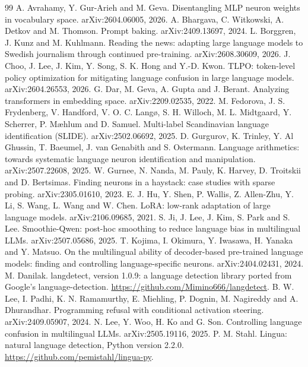 \documentclass[10pt,a4paper]{article}
\begin{document}
\begin{thebibliography}{99}\small\setlength{\itemsep}{1pt}
 A. Avrahamy, Y. Gur-Arieh and M. Geva. Disentangling MLP neuron weights in vocabulary space. arXiv:2604.06005, 2026.
 A. Bhargava, C. Witkowski, A. Detkov and M. Thomson. Prompt baking. arXiv:2409.13697, 2024.
 L. Borggren, J. Kunz and M. Kuhlmann. Reading the news: adapting large language models to Swedish journalism through continued pre-training. arXiv:2608.30609, 2026.
 J. Choo, J. Lee, J. Kim, Y. Song, S. K. Hong and Y.-D. Kwon. TLPO: token-level policy optimization for mitigating language confusion in large language models. arXiv:2604.26553, 2026.
 G. Dar, M. Geva, A. Gupta and J. Berant. Analyzing transformers in embedding space. arXiv:2209.02535, 2022.
 M. Fedorova, J. S. Frydenberg, V. Handford, V. O. C. Langø, S. H. Willoch, M. L. Midtgaard, Y. Scherrer, P. Mæhlum and D. Samuel. Multi-label Scandinavian language identification (SLIDE). arXiv:2502.06692, 2025.
 D. Gurgurov, K. Trinley, Y. Al Ghussin, T. Baeumel, J. van Genabith and S. Ostermann. Language arithmetics: towards systematic language neuron identification and manipulation. arXiv:2507.22608, 2025.
 W. Gurnee, N. Nanda, M. Pauly, K. Harvey, D. Troitskii and D. Bertsimas. Finding neurons in a haystack: case studies with sparse probing. arXiv:2305.01610, 2023.
 E. J. Hu, Y. Shen, P. Wallis, Z. Allen-Zhu, Y. Li, S. Wang, L. Wang and W. Chen. LoRA: low-rank adaptation of large language models. arXiv:2106.09685, 2021.
 S. Ji, J. Lee, J. Kim, S. Park and S. Lee. Smoothie-Qwen: post-hoc smoothing to reduce language bias in multilingual LLMs. arXiv:2507.05686, 2025.
 T. Kojima, I. Okimura, Y. Iwasawa, H. Yanaka and Y. Matsuo. On the multilingual ability of decoder-based pre-trained language models: finding and controlling language-specific neurons. arXiv:2404.02431, 2024.
 M. Danilak. langdetect, version 1.0.9: a language detection library ported from Google's language-detection. \url{https://github.com/Mimino666/langdetect}.
 B. W. Lee, I. Padhi, K. N. Ramamurthy, E. Miehling, P. Dognin, M. Nagireddy and A. Dhurandhar. Programming refusal with conditional activation steering. arXiv:2409.05907, 2024.
 N. Lee, Y. Woo, H. Ko and G. Son. Controlling language confusion in multilingual LLMs. arXiv:2505.19116, 2025.
 P. M. Stahl. Lingua: natural language detection, Python version 2.2.0. \url{https://github.com/pemistahl/lingua-py}.

\end{thebibliography}
\end{document}
